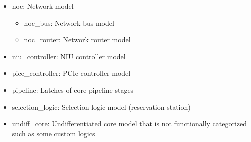 \begin{itemize}
\item{noc: Network model \vspace*{-5pt}\leavevmode
\begin{itemize}
\item{noc\_bus: Network bus model} \vspace*{-5pt}\leavevmode
\item{noc\_router: Network router model} \vspace*{-5pt}\leavevmode
\end{itemize}
}
\item{niu\_controller: NIU controller model} \vspace*{-5pt}\leavevmode
\item{pice\_controller: PCIe controller model} \vspace*{-5pt}\leavevmode
\item{pipeline: Latches of core pipeline stages} \vspace*{-5pt}\leavevmode
\item{selection\_logic: Selection logic model (reservation station)} \vspace*{-5pt}\leavevmode
\item{undiff\_core: Undifferentiated core model that is not functionally categorized such as some custom logics}
\end{itemize}

